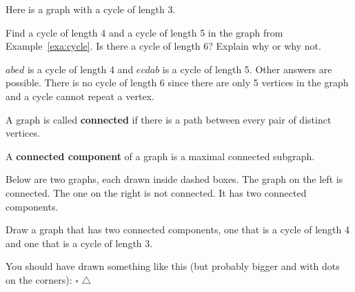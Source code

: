 \begin{exa}\label{exa:cycle}
Here is a graph with a cycle of length $3$.
\begin{center}
\end{center}
\end{exa}

\begin{exer}
Find a cycle of length 4 and a cycle of length 5 in the graph from Example~\ref{exa:cycle}.
Is there a cycle of length 6? Explain why or why not.

\noindent
\answerlinetwo
\begin{answer}
$abed$ is a cycle of length 4 and $ecdab$ is a cycle of length 5.
Other answers are possible.
There is no cycle of length 6 since there are only 5 vertices in the graph and a cycle cannot
repeat a vertex.
\end{answer}
\end{exer}

\begin{df}
A graph is called {\bf connected} if there is a path between every
pair of distinct vertices.

A {\bf connected component} of a graph is a maximal connected subgraph. 
\end{df}

\begin{exa}
Below are two graphs, each drawn inside dashed boxes.
The graph on the left is connected.  The one on the right
is not connected.  It has two connected components.
\begin{center}
\end{center}
\end{exa}


\begin{exer}
Draw a graph that has two connected components, one that is a cycle of length 4 and one
that is a cycle of length 3.

\vspace*{1in}
\begin{answer}
You should have drawn something like this (but probably bigger and with dots on the corners): $\square$   
$\triangle$
\end{answer}
\end{exer}


